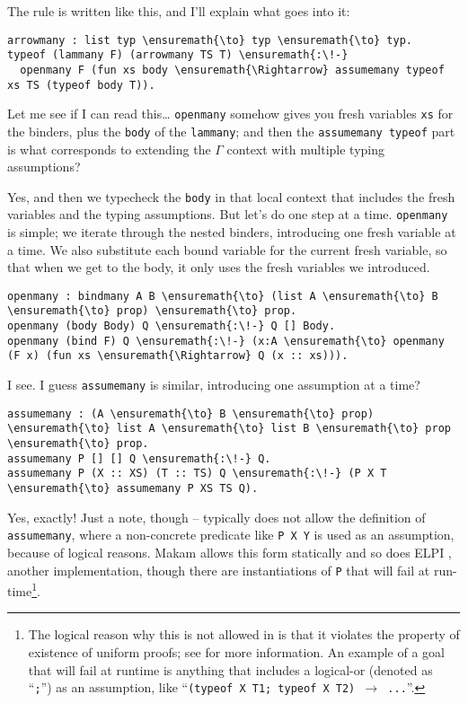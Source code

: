 \heroADVISOR{} The rule is written like this, and I'll explain what goes into
it:

\begin{verbatim}
arrowmany : list typ \ensuremath{\to} typ \ensuremath{\to} typ.
typeof (lammany F) (arrowmany TS T) \ensuremath{:\!-}
  openmany F (fun xs body \ensuremath{\Rightarrow} assumemany typeof xs TS (typeof body T)).
\end{verbatim}

\heroSTUDENT{} Let me see if I can read this\ldots{} \texttt{openmany} somehow
gives you fresh variables \texttt{xs} for the binders, plus the
\texttt{body} of the \texttt{lammany}; and then the
\texttt{assumemany\ typeof} part is what corresponds to extending the
\(\Gamma\) context with multiple typing assumptions?

\heroADVISOR{} Yes, and then we typecheck the \texttt{body} in that local
context that includes the fresh variables and the typing assumptions.
But let's do one step at a time. \texttt{openmany} is simple; we iterate
through the nested binders, introducing one fresh variable at a time. We
also substitute each bound variable for the current fresh variable, so
that when we get to the body, it only uses the fresh variables we
introduced.

\begin{verbatim}
openmany : bindmany A B \ensuremath{\to} (list A \ensuremath{\to} B \ensuremath{\to} prop) \ensuremath{\to} prop.
openmany (body Body) Q \ensuremath{:\!-} Q [] Body.
openmany (bind F) Q \ensuremath{:\!-} (x:A \ensuremath{\to} openmany (F x) (fun xs \ensuremath{\Rightarrow} Q (x :: xs))).
\end{verbatim}

\heroSTUDENT{} I see. I guess \texttt{assumemany} is similar, introducing one
assumption at a time?

\begin{verbatim}
assumemany : (A \ensuremath{\to} B \ensuremath{\to} prop) \ensuremath{\to} list A \ensuremath{\to} list B \ensuremath{\to} prop \ensuremath{\to} prop.
assumemany P [] [] Q \ensuremath{:\!-} Q.
assumemany P (X :: XS) (T :: TS) Q \ensuremath{:\!-} (P X T \ensuremath{\to} assumemany P XS TS Q).
\end{verbatim}

\heroADVISOR{} Yes, exactly! Just a note, though -- \lamprolog typically does
not allow the definition of \texttt{assumemany}, where a non-concrete
predicate like \texttt{P\ X\ Y} is used as an assumption, because of
logical reasons. Makam allows this form statically and so does ELPI
\citep{elpi-main-reference}, another \lamprolog implementation, though
there are instantiations of \texttt{P} that will fail at
run-time\footnote{The logical reason why this is not allowed in \lamprolog is that it violates the property of existence of uniform proofs; see \citet{assumemany-issue} for more information. An example of a goal that will fail at runtime is anything that includes a logical-or (denoted as ``\texttt{;}'') as an assumption, like ``\texttt{(typeof X T1; typeof X T2) \ensuremath{\to} ...}''.}.


